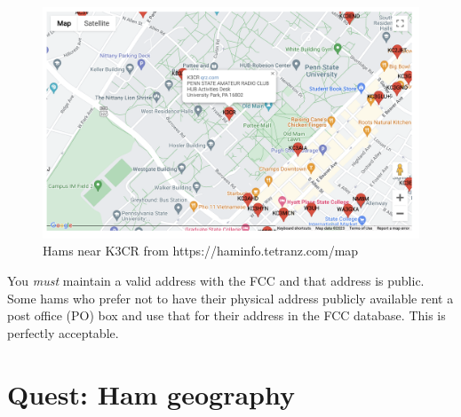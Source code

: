 \documentclass[
  letterpaper,
  DIV=11,
  numbers=noendperiod]{scrreport}
\begin{document}
\begin{figure}

{\centering \includegraphics[width=1\textwidth,height=\textheight]{include/img/hams-near-k3cr.png}

}

\caption{Hams near K3CR from https://haminfo.tetranz.com/map}

\end{figure}

\begin{tcolorbox}[enhanced jigsaw, colframe=quarto-callout-note-color-frame, opacitybacktitle=0.6, colback=white, arc=.35mm, toprule=.15mm, bottomtitle=1mm, breakable, titlerule=0mm, toptitle=1mm, title=\textcolor{quarto-callout-note-color}{\faInfo}\hspace{0.5em}{Note}, rightrule=.15mm, coltitle=black, left=2mm, colbacktitle=quarto-callout-note-color!10!white, opacityback=0, bottomrule=.15mm, leftrule=.75mm]

You \emph{must} maintain a valid address with the FCC and that address
is public. Some hams who prefer not to have their physical address
publicly available rent a post office (PO) box and use that for their
address in the FCC database. This is perfectly acceptable.

\end{tcolorbox}

\hypertarget{quest-ham-geography}{%
\chapter*{Quest: Ham geography}\label{quest-ham-geography}}

\end{document}
